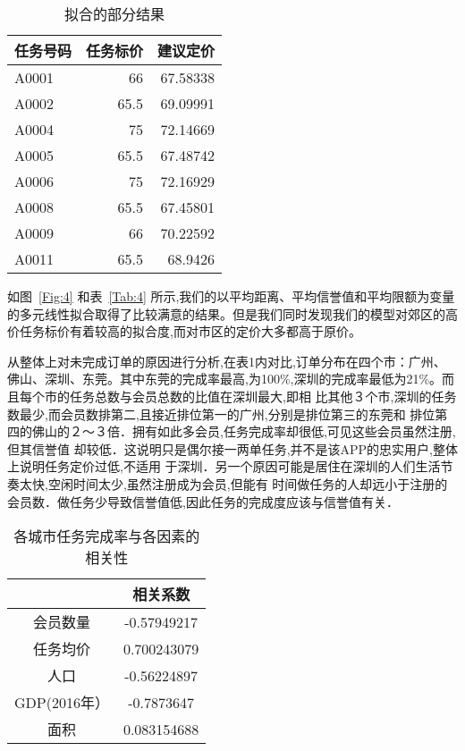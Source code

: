 \documentclass{cumcmthesis}
\begin{document}
\begin{table}[!htbp]
\centering
\caption{拟合的部分结果}\label{Tab:5} 
	\begin{tabular}{lrr}
		\toprule[1.5pt]
		任务号码  & {任务标价} & {建议定价} \\
		\midrule[1pt]
		A0001 & 66    & 67.58338 \\
		A0002 & 65.5  & 69.09991 \\
		A0004 & 75    & 72.14669 \\
		A0005 & 65.5  & 67.48742 \\
		A0006 & 75    & 72.16929 \\
		A0008 & 65.5  & 67.45801 \\
		A0009 & 66    & 70.22592 \\
		A0011 & 65.5  & 68.9426 \\
		\bottomrule[1.5pt]
	\end{tabular}%
\end{table}
如图~\ref{Fig:4} 和表~\ref{Tab:4} 所示,我们的以平均距离、平均信誉值和平均限额为变量的多元线性拟合取得了比较满意的结果。但是我们同时发现我们的模型对郊区的高价任务标价有着较高的拟合度,而对市区的定价大多都高于原价。

从整体上对未完成订单的原因进行分析,在表1内对比,订单分布在四个市：广州、佛山、深圳、东莞。其中东莞的完成率最高,为100\%,深圳的完成率最低为21\%。而且每个市的任务总数与会员总数的比值在深圳最大,即相 比其他３个市,深圳的任务数最少,而会员数排第二,且接近排位第一的广州,分别是排位第三的东莞和 排位第四的佛山的２～３倍．拥有如此多会员,任务完成率却很低,可见这些会员虽然注册,但其信誉值 却较低．这说明只是偶尔接一两单任务,并不是该APP的忠实用户,整体上说明任务定价过低,不适用 于深圳．另一个原因可能是居住在深圳的人们生活节奏太快,空闲时间太少,虽然注册成为会员,但能有 时间做任务的人却远小于注册的会员数．做任务少导致信誉值低,因此任务的完成度应该与信誉值有关． 


\begin{table}[!htbp]
	\caption{各城市任务完成率与各因素的相关性}\label{tab001} \centering
	    \begin{tabular}{cc}
	    \toprule[1.5pt]
		 $ $&{相关系数} \\
		\midrule[1pt]
		会员数量  & -0.57949217 \\
		任务均价  & 0.700243079 \\
		人口    & -0.56224897 \\
		GDP(2016年） & -0.7873647 \\
		面积    & 0.083154688 \\
		\bottomrule[1.5pt]
	\end{tabular}%
\end{table}
\end{document}
